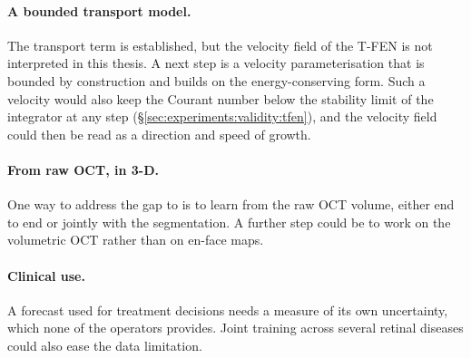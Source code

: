 \paragraph{A bounded transport model.}
The transport term is established, but the velocity field of the T-FEN
is not interpreted in this thesis. A next step is a velocity
parameterisation that is bounded by construction and builds on the
energy-conserving form. Such a velocity would also keep the Courant number
below the stability limit of the integrator at any step
(\S\ref{sec:experiments:validity:tfen}), and the velocity field could then
be read as a direction and speed of growth.

\paragraph{From raw OCT, in 3-D.}
One way to address the gap to \citet{Mai2024} is to learn from the raw
OCT volume, either end to end or jointly with the segmentation. A further
step could be to work on the volumetric OCT rather than on en-face maps.

\paragraph{Clinical use.}
A forecast used for treatment decisions needs a measure of its own
uncertainty, which none of the operators provides. Joint training across
several retinal diseases could also ease the data limitation.





